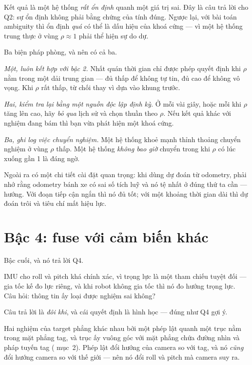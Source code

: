 \documentclass[../../marker.tex]{subfiles}
\begin{document}
Kết quả là một hệ thống \emph{rất ổn định} quanh một giá trị sai. Đây là câu trả lời cho Q2: sự ổn định không phải bằng chứng của tính đúng. Ngược lại, với bài toán ambiguity thì ổn định \emph{quá} có thể là dấu hiệu của khoá cứng --- vì một hệ thống trung thực ở vùng \(\rho \approx 1\) phải thể hiện sự do dự.

Ba biện pháp phòng, và nên có cả ba.

\emph{Một, luôn kết hợp với bậc 2.} Nhất quán thời gian chỉ được phép quyết định khi \(\rho\) nằm trong một dải trung gian --- đủ thấp để không tự tin, đủ cao để không vô vọng. Khi \(\rho\) rất thấp, từ chối thay vì dựa vào khung trước.

\emph{Hai, kiểm tra lại bằng một nguồn độc lập định kỳ.} Ở mỗi vài giây, hoặc mỗi khi \(\rho\) tăng lên cao, hãy \emph{bỏ qua} lịch sử và chọn thuần theo \(\rho\). Nếu kết quả khác với nghiệm đang bám thì bạn vừa phát hiện một khoá cứng.

\emph{Ba, ghi log việc chuyển nghiệm.} Một hệ thống khoẻ mạnh thỉnh thoảng chuyển nghiệm ở vùng \(\rho\) thấp. Một hệ thống \emph{không bao giờ} chuyển trong khi \(\rho\) có lúc xuống gần 1 là đáng ngờ.

Ngoài ra có một chi tiết cài đặt quan trọng: khi dùng dự đoán từ odometry, phải nhớ rằng odometry bánh xe có sai số tích luỹ và nó tệ nhất ở đúng thứ ta cần --- hướng. Với đoạn tiếp cận ngắn thì nó đủ tốt; với một khoảng thời gian dài thì dự đoán trôi và tiêu chí mất hiệu lực.

\section{Bậc 4: fuse với cảm biến khác}

Bậc cuối, và nó trả lời Q4.

IMU cho roll và pitch khá chính xác, vì trọng lực là một tham chiếu tuyệt đối --- gia tốc kế đo lực riêng, và khi robot không gia tốc thì nó đo hướng trọng lực. Câu hỏi: thông tin ấy loại được nghiệm sai không?

Câu trả lời là \emph{đôi khi}, và cái quyết định là hình học --- đúng như Q4 gợi ý.

Hai nghiệm của target phẳng khác nhau bởi một phép lật quanh một trục nằm trong mặt phẳng tag, và trục ấy vuông góc với mặt phẳng chứa đường nhìn và pháp tuyến tag ( mục~2). Phép lật đổi hướng của camera so với tag, và nó \emph{cũng} đổi hướng camera so với thế giới --- nên nó đổi roll và pitch mà camera suy ra.
\end{document}
